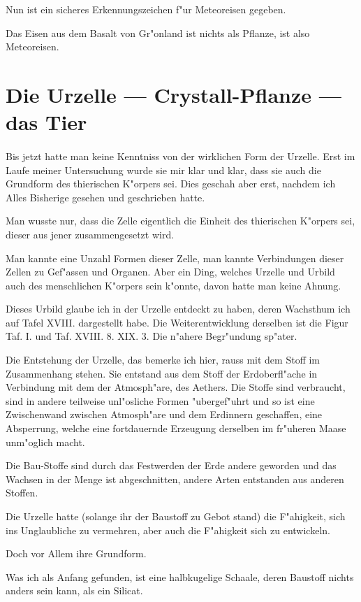 \documentclass[a4paper, 11pt, oneside, german]{article}
\begin{document}
Nun ist ein sicheres Erkennungszeichen f"ur Meteoreisen gegeben.

Das Eisen aus dem Basalt von Gr"onland ist nichts als Pflanze, ist also Meteoreisen.
\clearpage
\section{Die Urzelle --- Crystall-Pflanze --- das Tier}
\paragraph{}
Bis jetzt hatte man keine Kenntniss von der wirklichen Form der Urzelle. Erst im Laufe meiner Untersuchung wurde sie mir klar und klar, dass sie auch die Grundform des thierischen K"orpers sei. Dies geschah aber erst, nachdem ich Alles Bisherige gesehen und geschrieben hatte.

Man wusste nur, dass die Zelle eigentlich die Einheit des thierischen K"orpers sei, dieser aus jener zusammengesetzt wird.

Man kannte eine Unzahl Formen dieser Zelle, man kannte Verbindungen dieser Zellen zu Gef"assen und Organen. Aber ein Ding, welches Urzelle und Urbild auch des menschlichen K"orpers sein k"onnte, davon hatte man keine Ahnung.

Dieses Urbild glaube ich in der Urzelle entdeckt zu haben, deren Wachsthum ich auf Tafel XVIII. dargestellt habe. Die Weiterentwicklung derselben ist die Figur Taf. I. und Taf. XVIII. 8. XIX. 3. Die n"ahere Begr"undung sp"ater.

Die Entstehung der Urzelle, das bemerke ich hier, rauss mit dem Stoff im Zusammenhang stehen. Sie entstand aus dem Stoff der Erdoberfl"ache in Verbindung mit dem der Atmosph"are, des Aethers. Die Stoffe sind verbraucht, sind in andere teilweise unl"osliche Formen "ubergef"uhrt und so ist eine Zwischenwand zwischen Atmosph"are und dem Erdinnern geschaffen, eine Absperrung, welche eine fortdauernde Erzeugung derselben im fr"uheren Maase unm"oglich macht.

Die Bau-Stoffe sind durch das Festwerden der Erde andere geworden und das Wachsen in der Menge ist abgeschnitten, andere Arten entstanden aus anderen Stoffen.

Die Urzelle hatte (solange ihr der Baustoff zu Gebot stand) die F"ahigkeit, sich ins Unglaubliche zu vermehren, aber auch die F"ahigkeit sich zu entwickeln.

Doch vor Allem ihre Grundform.

Was ich als Anfang gefunden, ist eine halbkugelige Schaale, deren Baustoff nichts anders sein kann, als ein Silicat.
\end{document}

